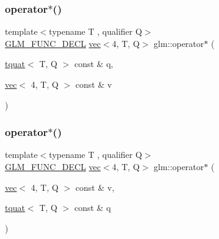 \subsubsection{\texorpdfstring{operator$\ast$()}{operator*()}\hspace{0.1cm}{\footnotesize\ttfamily [4/7]}}
{\footnotesize\ttfamily template$<$typename T , qualifier Q$>$ \\
\hyperlink{setup_8hpp_ab2d052de21a70539923e9bcbf6e83a51}{G\+L\+M\+\_\+\+F\+U\+N\+C\+\_\+\+D\+E\+CL} \hyperlink{structglm_1_1vec}{vec}$<$4, T, Q$>$ glm\+::operator$\ast$ (\begin{DoxyParamCaption}\item[{\hyperlink{structglm_1_1tquat}{tquat}$<$ T, Q $>$ const \&}]{q,  }\item[{\hyperlink{structglm_1_1vec}{vec}$<$ 4, T, Q $>$ const \&}]{v }\end{DoxyParamCaption})}

\mbox{\label{group__gtc__quaternion_ga16c91c9dc2f0346faa3742888339b11d}} 
\subsubsection{\texorpdfstring{operator$\ast$()}{operator*()}\hspace{0.1cm}{\footnotesize\ttfamily [5/7]}}
{\footnotesize\ttfamily template$<$typename T , qualifier Q$>$ \\
\hyperlink{setup_8hpp_ab2d052de21a70539923e9bcbf6e83a51}{G\+L\+M\+\_\+\+F\+U\+N\+C\+\_\+\+D\+E\+CL} \hyperlink{structglm_1_1vec}{vec}$<$4, T, Q$>$ glm\+::operator$\ast$ (\begin{DoxyParamCaption}\item[{\hyperlink{structglm_1_1vec}{vec}$<$ 4, T, Q $>$ const \&}]{v,  }\item[{\hyperlink{structglm_1_1tquat}{tquat}$<$ T, Q $>$ const \&}]{q }\end{DoxyParamCaption})}

\mbox{\label{group__gtc__quaternion_ga603ee29c61884b9438d5eae0c548b891}} 
